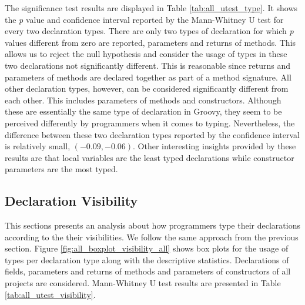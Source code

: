 \documentclass[preprint]{sigplanconf}
\begin{document}
The significance test results are displayed in Table \ref{tab:all_utest_type}.
It shows the \emph{p} value and confidence interval reported by the Mann-Whitney U test for every two declaration types.
There are only two types of declaration for which \emph{p} values different from zero are reported, parameters and returns of methods.
This allows us to reject the null hypothesis and consider the usage of types in these two declarations not significantly different.
This is reasonable since returns and parameters of methods are declared together as part of a method signature.
All other declaration types, however, can be considered significantly different from each other.
This includes parameters of methods and constructors.
Although these are essentially the same type of declaration in Groovy, they seem to be perceived differently by programmers when it comes to typing.
Nevertheless, the difference between these two declaration types reported by the confidence interval is relatively small, $(-0.09, -0.06)$.
Other interesting insights provided by these results are that local variables are the least typed declarations while constructor parameters are the most typed.

\subsection{Declaration Visibility\label{sub:res_all_visibility}}
This sections presents an analysis about how programmers type their declarations according to the their visibilities.
We follow the same approach from the previous section.
Figure \ref{fig:all_boxplot_visibility_all} shows box plots for the usage of types per declaration type along with the descriptive statistics.
Declarations of fields, parameters and returns of methods and parameters of constructors of all projects are considered.
Mann-Whitney U test results are presented in Table \ref{tab:all_utest_visibility}.
\end{document}
